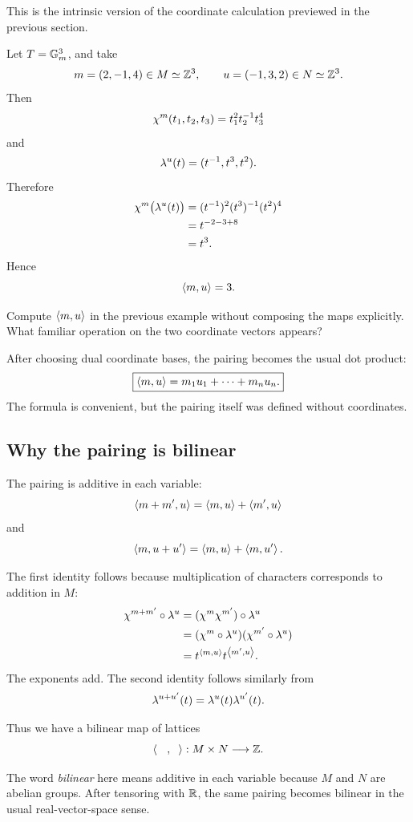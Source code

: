 This is the intrinsic version of the coordinate calculation previewed
in the previous section.

\begin{example}
Let \(T=\mathbb{G}_{m}^3\), and take
\[
m=(2,-1,4)\in M\simeq\mathbb{Z}^3,
\qquad
u=(-1,3,2)\in N\simeq\mathbb{Z}^3.
\]
Then
\[
\chi^{m}(t_1,t_2,t_3)
=
t_1^2t_2^{-1}t_3^4
\]
and
\[
\lambda^{u}(t)
=
(t^{-1},t^3,t^2).
\]
Therefore
\[
\begin{aligned}
\chi^{m}\bigl(\lambda^{u}(t)\bigr)
&=
(t^{-1})^2(t^3)^{-1}(t^2)^4\\
&=
t^{-2-3+8}\\
&=
t^3.
\end{aligned}
\]
Hence
\[
\left\langle m,u\right\rangle=3.
\]
\end{example}

\begin{pauseandthink}
Compute \(\left\langle m,u\right\rangle\) in the previous example without composing the
maps explicitly. What familiar operation on the two coordinate
vectors appears?
\end{pauseandthink}

After choosing dual coordinate bases, the pairing becomes the usual
dot product:
\[
\boxed{
\left\langle m,u\right\rangle
=
m_1u_1+\cdots+m_nu_n.
}
\]
The formula is convenient, but the pairing itself was defined without
coordinates.

\subsection{Why the pairing is bilinear}

The pairing is additive in each variable:
\[
\left\langle m+m',u\right\rangle
=
\left\langle m,u\right\rangle+\left\langle m',u\right\rangle
\]
and
\[
\left\langle m,u+u'\right\rangle
=
\left\langle m,u\right\rangle+\left\langle m,u'\right\rangle.
\]

The first identity follows because multiplication of characters
corresponds to addition in \(M\):
\[
\begin{aligned}
\chi^{m+m'}\circ\lambda^{u}
&=
(\chi^{m}\chi^{m'})\circ\lambda^{u}\\
&=
(\chi^{m}\circ\lambda^{u})
(\chi^{m'}\circ\lambda^{u})\\
&=
t^{\left\langle m,u\right\rangle}
t^{\left\langle m',u\right\rangle}.
\end{aligned}
\]
The exponents add. The second identity follows similarly from
\[
\lambda^{u+u'}(t)
=
\lambda^{u}(t)\lambda^{u'}(t).
\]

Thus we have a bilinear map of lattices
\[
\left\langle \phantom{m},\phantom{u}\right\rangle:
M\times N\longrightarrow\mathbb{Z}.
\]

\begin{observation}
The word \emph{bilinear} here means additive in each variable because
\(M\) and \(N\) are abelian groups. After tensoring with \(\mathbb{R}\), the
same pairing becomes bilinear in the usual real-vector-space sense.
\end{observation}

